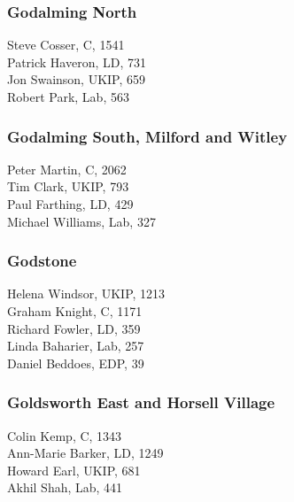 \documentclass[a4paper,openany,10pt]{book}
\begin{document}
\subsubsection*{Godalming North}



Steve Cosser, C, 1541\\
Patrick Haveron, LD, 731\\
Jon Swainson, UKIP, 659\\
Robert Park, Lab, 563\\


\subsubsection*{Godalming South, Milford and Witley}



Peter Martin, C, 2062\\
Tim Clark, UKIP, 793\\
Paul Farthing, LD, 429\\
Michael Williams, Lab, 327\\


\subsubsection*{Godstone}



Helena Windsor, UKIP, 1213\\
Graham Knight, C, 1171\\
Richard Fowler, LD, 359\\
Linda Baharier, Lab, 257\\
Daniel Beddoes, EDP, 39\\


\subsubsection*{Goldsworth East and Horsell Village}



Colin Kemp, C, 1343\\
Ann-Marie Barker, LD, 1249\\
Howard Earl, UKIP, 681\\
Akhil Shah, Lab, 441\\
\end{document}
